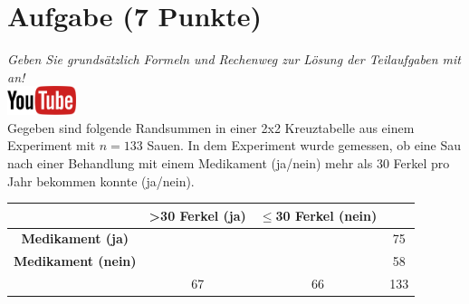 \documentclass[a4paper, 10pt]{scrartcl}\usepackage[]{graphicx}\usepackage[]{xcolor}
\begin{document}
\section{Aufgabe \hfill (7 Punkte)}

\textit{Geben Sie grunds{\"a}tzlich Formeln und Rechenweg zur L{\"o}sung der
  Teilaufgaben mit an!} \\[1Ex]

\hfill\href{https://youtu.be/jakM7fHyZfU}{\includegraphics[width =
  2cm]{img/youtube}}\\[1Ex]




Gegeben sind folgende Randsummen in einer 2x2 Kreuztabelle aus einem
Experiment mit $n = 133$ Sauen. In dem Experiment wurde gemessen,
ob eine Sau nach einer Behandlung mit einem Medikament (ja/nein)
mehr als 30 Ferkel pro Jahr bekommen konnte (ja/nein).

\vspace{5Ex}

\begin{center}
  \Large
  \begin{tabular}{c|c|c|c}
     & \textbf{>30 Ferkel (ja)} & \textbf{$\leq$30 Ferkel (nein)} &  \strut\\
    \hline
    \textbf{Medikament (ja)} & \phantom{100}  & \phantom{100}  &   75  \strut\\
    \hline
    \textbf{Medikament (nein)} & \phantom{100}  & \phantom{100}  &   58   \strut\\
    \hline
     &  67 &  66 &  133  \strut\\
  \end{tabular}
\end{center}



\vspace{5Ex}
\end{document}
